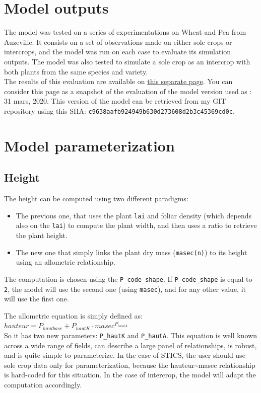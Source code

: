\documentclass[
]{book}
\providecommand{\tightlist}{%
  \setlength{\itemsep}{0pt}\setlength{\parskip}{0pt}}
\begin{document}
\hypertarget{model-outputs}{%
\section{Model outputs}\label{model-outputs}}

The model was tested on a series of experimentations on Wheat and Pea from Auzeville. It consists on a set of observations made on either sole crops or intercrops, and the model was run on each case to evaluate its simulation outputs. The model was also tested to simulate a sole crop as an intercrop with both plants from the same species and variety.\\
The results of this evaluation are available on \href{Auzeville_summary.html}{this separate page}.
You can consider this page as a snapshot of the evaluation of the model version used as : 31 mars, 2020. This version of the model can be retrieved from my GIT repository using this SHA: \texttt{c9638aafb924949b630d273608d2b3c45369cd0c}.

\hypertarget{model-parameterization}{%
\section{Model parameterization}\label{model-parameterization}}

\hypertarget{height-1}{%
\subsection{Height}\label{height-1}}

The height can be computed using two different paradigms:

\begin{itemize}
\tightlist
\item
  The previous one, that uses the plant \texttt{lai} and foliar density (which depends also on the \texttt{lai}) to compute the plant width, and then uses a ratio to retrieve the plant height.\\
\item
  The new one that simply links the plant dry mass (\texttt{masec(n)}) to its height using an allometric relationship.
\end{itemize}

The computation is chosen using the \texttt{P\_code\_shape}. If \texttt{P\_code\_shape} is equal to \texttt{2}, the model will use the second one (using \texttt{masec}), and for any other value, it will use the first one.

The allometric equation is simply defined as:\\
\(hauteur= P_{hautbase} + P_{hautK} \cdot masec^{P_{hautA}}\)\\
So it has two new parameters: \texttt{P\_hautK} and \texttt{P\_hautA}.
This equation is well known across a wide range of fields, can describe a large panel of relationships, is robust, and is quite simple to parameterize. In the case of STICS, the user should use sole crop data only for parameterization, because the hauteur\textasciitilde masec relationship is hard-coded for this situation. In the case of intercrop, the model will adapt the computation accordingly.
\end{document}
